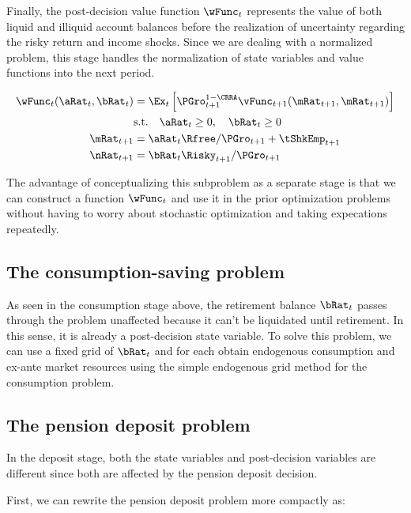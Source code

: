 \documentclass[\econtexRoot/SequentialEGM]{subfiles}
\begin{document}
Finally, the post-decision value function $\wFunc_{t}$ represents the value of both liquid and illiquid account balances before the realization of uncertainty regarding the risky return and income shocks. Since we are dealing with a normalized problem, this stage handles the normalization of state variables and value functions into the next period.

\begin{equation}
	\begin{split}
		\wFunc_{t}(\aRat_{t}, \bRat_{t}) & = \Ex_{t} \left[ \PGro_{t+1}^{1-\CRRA} \vFunc_{t+1}(\mRat_{t+1}, \mRat_{t+1}) \right] \\
		& \text{s.t.} \quad \aRat_{t} \ge 0, \quad \bRat_{t} \ge 0 \\
		\mRat_{t+1} & = \aRat_{t} \Rfree / \PGro_{t+1}  + \tShkEmp_{t+1} \\
		\nRat_{t+1} & = \bRat_{t} \Risky_{t+1} /  \PGro_{t+1}
	\end{split}
\end{equation}

The advantage of conceptualizing this subproblem as a separate stage is that we can construct a function $\wFunc_{t}$ and use it in the prior optimization problems without having to worry about stochastic optimization and taking expecations repeatedly.

\subsection{The consumption-saving problem}

As seen in the consumption stage above, the retirement balance $\bRat_{t}$ passes through the problem unaffected because it can't be liquidated until retirement. In this sense, it is already a post-decision state variable. To solve this problem, we can use a fixed grid of $\bRat_{t}$ and for each obtain endogenous consumption and ex-ante market resources using the simple endogenous grid method for the consumption problem.

\subsection{The pension deposit problem}

In the deposit stage, both the state variables and post-decision variables are different since both are affected by the pension deposit decision.

First, we can rewrite the pension deposit problem more compactly as:
\end{document}
